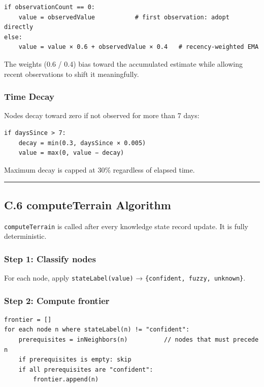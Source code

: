 \documentclass[
]{article}
\begin{document}
\begin{verbatim}
if observationCount == 0:
    value = observedValue           # first observation: adopt directly
else:
    value = value × 0.6 + observedValue × 0.4   # recency-weighted EMA
\end{verbatim}

The weights (0.6 / 0.4) bias toward the accumulated estimate while allowing recent observations to shift it meaningfully.

\subsubsection{Time Decay}\label{time-decay}

Nodes decay toward zero if not observed for more than 7 days:

\begin{verbatim}
if daysSince > 7:
    decay = min(0.3, daysSince × 0.005)
    value = max(0, value − decay)
\end{verbatim}

Maximum decay is capped at 30\% regardless of elapsed time.

\begin{center}\rule{0.5\linewidth}{0.5pt}\end{center}

\subsection{C.6 computeTerrain Algorithm}\label{c6-computeterrain-algorithm}

\texttt{computeTerrain} is called after every knowledge state record update. It is fully deterministic.

\subsubsection{Step 1: Classify nodes}\label{step-1-classify-nodes}

For each node, apply \texttt{stateLabel(value)} → \texttt{\{confident,\ fuzzy,\ unknown\}}.

\subsubsection{Step 2: Compute frontier}\label{step-2-compute-frontier}

\begin{verbatim}
frontier = []
for each node n where stateLabel(n) != "confident":
    prerequisites = inNeighbors(n)          // nodes that must precede n
    if prerequisites is empty: skip
    if all prerequisites are "confident":
        frontier.append(n)
\end{verbatim}
\end{document}

